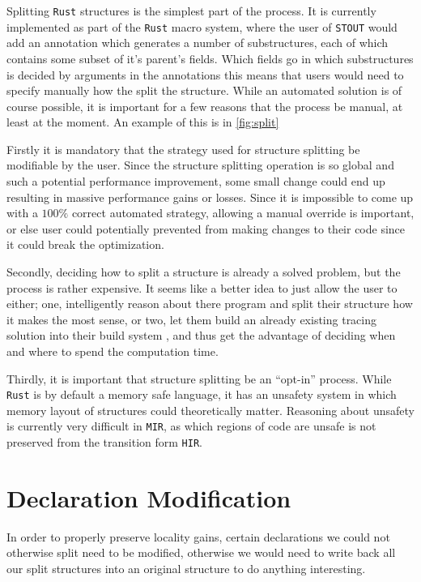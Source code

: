 \documentclass[12pt,oneside]{book}
\newcommand{\rustname}{{\texttt{Rust}}}
\def \rust {\rustname{}\xspace}
\newcommand{\mirname}{{\texttt{MIR}}}
\def \mir {\mirname{}\xspace}
\newcommand{\hirname}{{\texttt{HIR}}}
\def \hir {\hirname{}\xspace}
\newcommand{\projectname}{{\texttt{STOUT}}}
\def \name{\projectname\xspace}
\begin{document}
Splitting \rust structures is the simplest part of the process. It is currently
implemented as part of the \rust macro system, where the user of \name
would add an annotation which generates a number
of substructures, each of which contains some subset of it's parent's 
fields. Which fields go in which substructures is decided by arguments 
in the annotations 
this means
that users would need to specify manually how the split the structure. While an
automated solution is of course possible, it is important for a few reasons that
the process be manual, at least at the moment. An example of this
is in \ref{fig:split}

Firstly it is mandatory that the strategy used 
for structure splitting be modifiable by the user.
Since the structure splitting operation is so global 
and such a potential performance improvement,
some small change could end up resulting in 
massive performance gains or losses. Since it is impossible
to come up with a $100\%$ correct automated strategy, 
allowing a manual override is important, or else
user could potentially prevented from making changes to their code
since it could break the optimization.

Secondly, deciding how to split a structure is already a solved problem,
but the process is rather expensive. 
It seems like a better idea to just 
allow the user to either; one, 
intelligently reason about there program and split their structure 
how it makes the most sense, or two, 
let them build an already existing tracing solution into their build system
, and thus get the advantage
of deciding when and where to spend the computation time.

Thirdly, it is important that structure splitting be an ``opt-in'' process.
While \rust is by default a memory safe language, it has an
unsafety system in which memory layout of structures could theoretically matter.
Reasoning about unsafety is currently very difficult in \mir, as
which regions of code are unsafe is not preserved from the transition
form \hir.

\section{Declaration Modification}
In order to properly preserve locality gains, certain declarations
we could not otherwise split need to be modified, otherwise we would need
to write back all our split structures into an original structure to
do anything interesting.
\end{document}
